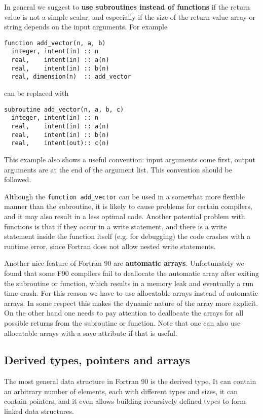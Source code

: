 \documentclass{article}
\begin{document}
In general we suggest to {\bf use subroutines instead of functions} if the
return value is not a simple scalar, and especially if the size of 
the return value array or string depends on the input arguments. 
For example
\begin{verbatim}
function add_vector(n, a, b)
  integer, intent(in) :: n
  real,    intent(in) :: a(n)
  real,    intent(in) :: b(n)
  real, dimension(n)  :: add_vector
\end{verbatim}
can be replaced with
\begin{verbatim}
subroutine add_vector(n, a, b, c)
  integer, intent(in) :: n
  real,    intent(in) :: a(n)
  real,    intent(in) :: b(n)
  real,    intent(out):: c(n)
\end{verbatim}
This example also shows a useful convention: input arguments come first,
output arguments are at the end of the argument list. This convention
should be followed.

Although the {\tt function add\_vector} can be used in a somewhat 
more flexible manner than the subroutine, 
it is likely to cause problems for certain 
compilers, and it may also result in a less optimal code. Another
potential problem with functions is that if they occur in a write
statement, and there is a write statement inside the function itself (e.g.
for debugging) the code crashes with a runtime error, since Fortran
does not allow nested write statements. 

Another nice feature of Fortran 90 are {\bf automatic arrays}. 
Unfortunately we found
that some F90 compilers fail to deallocate the automatic array after exiting 
the subroutine or function, which results in a memory leak and eventually
a run time crash. For this reason we have to use allocatable arrays instead
of automatic arrays. In some respect this makes the dynamic nature
of the array more explicit. On the other hand one needs to pay attention
to deallocate the arrays for all possible returns from the subroutine 
or function. Note that one can also use allocatable arrays with a save
attribute if that is useful.

\subsection{Derived types, pointers and arrays}

The most general data structure in Fortran 90 is the derived type.
It can contain an arbitrary number of elements, each with different
types and sizes, it can contain pointers, and it even allows building
recursively defined types to form linked data structures.
\end{document}
